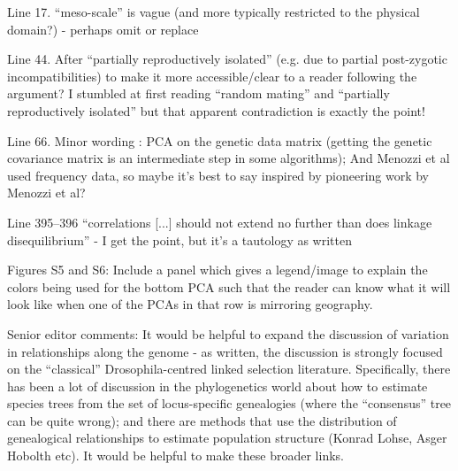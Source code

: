 \begin{point}{Line 17.}
    ``meso-scale'' is vague (and more typically restricted to the physical domain?) - perhaps omit or replace
\end{point}


\begin{point}{Line 44.}
    After ``partially reproductively isolated'' (e.g. due to partial post-zygotic incompatibilities) to make it more accessible/clear to a reader following the argument? I stumbled at first reading ``random mating'' and ``partially reproductively isolated'' but that apparent contradiction is exactly the point!
\end{point}


\begin{point}{Line 66.}
    Minor wording : PCA on the genetic data matrix (getting the genetic covariance matrix is an intermediate step in some algorithms); And Menozzi et al used frequency data, so maybe it's best to say inspired by pioneering work by Menozzi et al?
\end{point}


\begin{point}{Line 395--396} ``correlations [...] should not extend no further than does linkage disequilibrium'' - I get the point, but it's a tautology as written
\end{point}


\begin{point}{Figures S5 and S6:} 
    Include a panel which gives a legend/image to explain the colors being used for the bottom PCA such that the reader can know what it will look like when one of the PCAs in that row is mirroring geography.
\end{point}


\begin{point}{Senior editor comments:}
    It would be helpful to expand the discussion of variation in relationships
    along the genome - as written, the discussion is strongly focused on the
    ``classical'' Drosophila-centred linked selection literature.  Specifically,
    there has been a lot of discussion in the phylogenetics world about how to
    estimate species trees from the set of locus-specific genealogies (where the
    ``consensus'' tree can be quite wrong); and there are methods that use the
    distribution of genealogical relationships to estimate population structure
    (Konrad Lohse, Asger Hobolth etc).  It would be helpful to make these broader
    links.  
\end{point}

